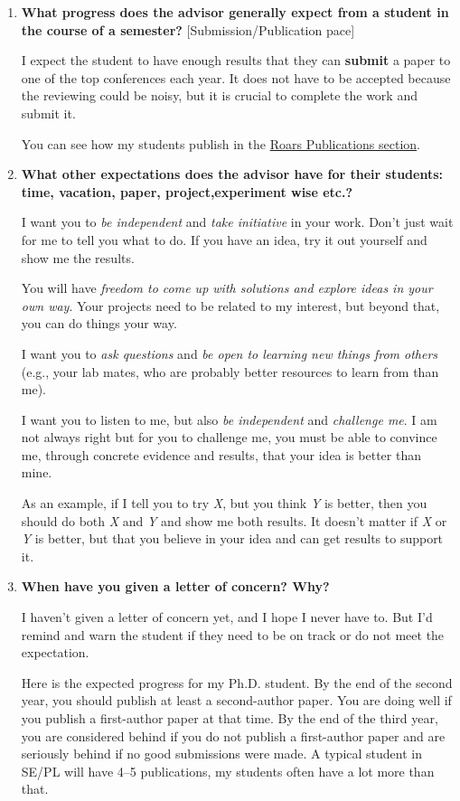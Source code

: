 \documentclass{article}
\begin{document}
\begin{enumerate}[label=\arabic*.]
    \item \textbf{What progress does the advisor generally expect from a student in the course of a semester?} [Submission/Publication pace]  
    
    I expect the student to have enough results that they can \textbf{submit} a paper to one of the top conferences each year. It does not have to be accepted because the reviewing could be noisy, but it is crucial to complete the work and submit it. 
    
    You can see how my students publish in the \href{https://roars.dev#publications}{Roars Publications section}. %

    \item \textbf{What other expectations does the advisor have for their students: time, vacation, paper, project,experiment wise etc.?}

    I want you to \textit{be independent} and \textit{take initiative} in your work. Don't just wait for me to tell you what to do. If you have an idea, try it out yourself and show me the results.
    
    You will have \textit{freedom to come up with solutions and explore ideas in your own way}. Your projects need to be related to my interest, but beyond that, you can do things your way.  
    
    I want you to \textit{ask questions} and \textit{be open to learning new things from others} (e.g., your lab mates, who are probably better resources to learn from than me).  
    
    I want you to listen to me, but also \textit{be independent} and \textit{challenge me}. I am not always right but for you to challenge me, you must be able to convince me, through concrete evidence and results, that your idea is better than mine. 
    
    As an example, if I tell you to try \textit{X}, but you think \textit{Y} is better, then you should do both \textit{X} and \textit{Y} and show me both results. It doesn't matter if \textit{X} or \textit{Y} is better, but that you believe in your idea and can get results to support it.

    \item \textbf{When have you given a letter of concern? Why?}  
    
    I haven't given a letter of concern yet, and I hope I never have to.  
    But I'd remind and warn the student if they need to be on track or do not meet the expectation. 
    
    Here is the expected progress for my Ph.D. student. By the end of the second year, you should publish at least a second-author paper. You are doing well if you publish a first-author paper at that time. By the end of the third year, you are considered behind if you do not publish a first-author paper and are seriously behind if no good submissions were made. A typical student in SE/PL will have 4--5 publications, my students often have a lot more than that.
\end{enumerate}
\end{document}
